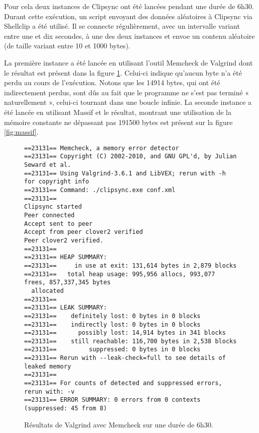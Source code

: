 Pour cela deux instances de Clipsync ont été lancées pendant une durée
de 6h30. Durant cette exécution, un script envoyant des données aléatoires
à Clipsync via Shellclip a été utilisé. Il se connecte régulièrement, avec
un intervalle variant entre une et dix secondes, à une des deux instances et
envoe un contenu aléatoire (de taille variant entre 10 et 1000 bytes).

La première instance a été lancée en utilisant l'outil
Memcheck de Valgrind dont le résultat est présent dans la figure
\ref{fig:memcheck}. Celui-ci indique qu'aucun byte n'a été perdu au cours
de l'exécution. Notons que les 14914 bytes, qui ont été indirectement perdus,
sont dûs au fait que le programme ne s'est pas terminé « naturellement »,
celui-ci tournant dans une boucle infinie.
La seconde instance a été lancée en utilisant Massif et le résultat,
montrant une utilisation de la mémoire constante ne dépassant pas 191500
bytes est présent sur la figure \ref{fig:massif}.

\begin{figure}[!h]
  \centering
  \scriptsize{
\begin{verbatim}
==23131== Memcheck, a memory error detector
==23131== Copyright (C) 2002-2010, and GNU GPL'd, by Julian Seward et al.
==23131== Using Valgrind-3.6.1 and LibVEX; rerun with -h for copyright info
==23131== Command: ./clipsync.exe conf.xml
==23131==
Clipsync started
Peer connected
Accept sent to peer
Accept from peer clover2 verified
Peer clover2 verified.
==23131==
==23131== HEAP SUMMARY:
==23131==     in use at exit: 131,614 bytes in 2,879 blocks
==23131==   total heap usage: 995,956 allocs, 993,077 frees, 857,337,345 bytes
  allocated
==23131==
==23131== LEAK SUMMARY:
==23131==    definitely lost: 0 bytes in 0 blocks
==23131==    indirectly lost: 0 bytes in 0 blocks
==23131==      possibly lost: 14,914 bytes in 341 blocks
==23131==    still reachable: 116,700 bytes in 2,538 blocks
==23131==         suppressed: 0 bytes in 0 blocks
==23131== Rerun with --leak-check=full to see details of leaked memory
==23131==
==23131== For counts of detected and suppressed errors, rerun with: -v
==23131== ERROR SUMMARY: 0 errors from 0 contexts (suppressed: 45 from 8)
\end{verbatim}
  }
  \caption{Résultats de Valgrind avec Memcheck sur une durée de 6h30.}
  \label{fig:memcheck}
\end{figure}

